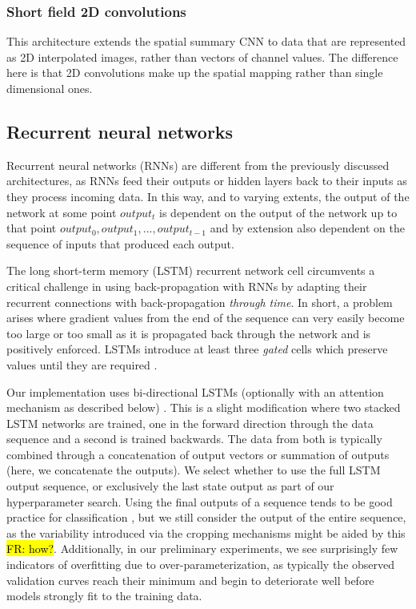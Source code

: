 \documentclass[utf8]{frontiersSCNS} %
\newcommand{\FR}[1]{{\small \textcolor{red}{\hl{FR: #1}}}}
\begin{document}
\subsubsection{Short field 2D convolutions}

This architecture extends the spatial summary CNN to data that are represented as 2D interpolated images, rather than vectors of channel values. The difference here is that 2D convolutions make up the spatial mapping rather than single dimensional ones.
 
\subsection{Recurrent neural networks} \label{sec:rnns}

Recurrent neural networks (RNNs) are different from the previously discussed architectures, as RNNs feed their outputs or hidden layers back to their inputs as they process incoming data. In this way, and to varying extents, the output of the network at some point $output_t$ is dependent on the output of the network up to that point $output_0, output_1, ..., output_{t-1}$ and by extension also dependent on the sequence of inputs that produced each output. 

The long short-term memory (LSTM) \cite{Hochreiter1997a} recurrent network cell circumvents a critical challenge in using back-propagation with RNNs by adapting their recurrent connections with back-propagation {\em through time}. In short, a problem arises where gradient values from the end of the sequence can very easily become too large or too small as it is propagated back through the network and is positively enforced. LSTMs introduce at least three \emph{gated} cells which preserve values until they are required  \cite{GravesRNNBook}.

Our implementation uses bi-directional LSTMs (optionally with an attention mechanism as described below) \cite{GravesRNNBook}. This is a slight modification where two stacked LSTM networks are trained, one in the forward direction through the data sequence and a second is trained backwards. The data from both is typically combined through a concatenation of output vectors or summation of outputs (here, we concatenate the outputs). We select whether to use the full LSTM output sequence, or exclusively the last state output as part of our hyperparameter search. Using the final outputs of a sequence tends to be good practice for classification \cite{}, but we still consider the output of the entire sequence, as the variability introduced via the cropping mechanisms might be aided by this \FR{how?}. Additionally, in our preliminary experiments, we see surprisingly few indicators of overfitting due to over-parameterization, as typically the observed validation curves reach their minimum and begin to deteriorate well before models strongly fit to the training data. 
\end{document}
